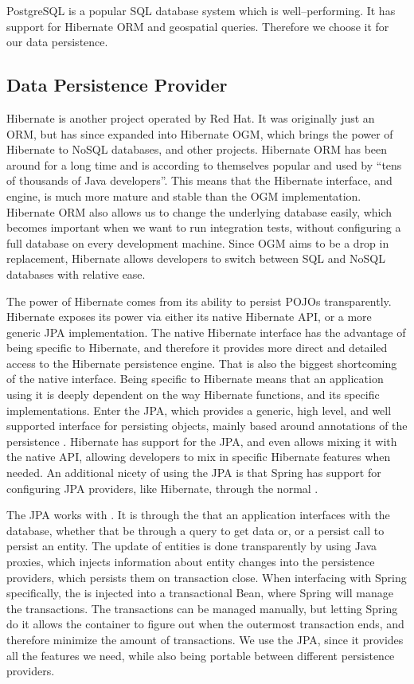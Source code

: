 PostgreSQL is a popular SQL database system which is well--performing.
It has support for Hibernate ORM and geospatial queries.
Therefore we choose it for our data persistence.

\subsection{Data Persistence Provider}
Hibernate is another project operated by Red Hat.
It was originally just an \ac{ORM}, but has since expanded into Hibernate \ac{OGM}, which brings the power of Hibernate to NoSQL databases, and other projects.
Hibernate \ac{ORM} has been around for a long time and is according to themselves popular and used by ``tens of thousands of Java developers''.\cite{hibernate_pop}
This means that the Hibernate interface, and engine, is much more mature and stable than the \ac{OGM} implementation.
Hibernate \ac{ORM} also allows us to change the underlying database easily, which becomes important when we want to run integration tests, without configuring a full database on every development machine.
Since \ac{OGM} aims to be a drop in replacement, Hibernate allows developers to switch between SQL and NoSQL databases with relative ease.

The power of Hibernate comes from its ability to persist \acp{POJO} transparently.
Hibernate exposes its power via either its native Hibernate API, or a more generic \ac{JPA} implementation.
The native Hibernate interface has the advantage of being specific to Hibernate, and therefore it provides more direct and detailed access to the Hibernate persistence engine.
That is also the biggest shortcoming of the native interface.
Being specific to Hibernate means that an application using it is deeply dependent on the way Hibernate functions, and its specific implementations.
Enter the \ac{JPA}, which provides a generic, high level, and well supported interface for persisting objects, mainly based around annotations of the persistence .
Hibernate has support for the \ac{JPA}, and even allows mixing it with the native API, allowing developers to mix in specific Hibernate features when needed.
An additional nicety of using the \ac{JPA} is that Spring has support for configuring \ac{JPA} providers, like Hibernate, through the normal .

The \ac{JPA} works with .
It is through the  that an application interfaces with the database, whether that be through a query to get data or, or a persist call to persist an entity.
The update of entities is done transparently by using Java proxies, which injects information about entity changes into the persistence providers, which persists them on transaction close.
When interfacing with Spring specifically, the  is injected into a transactional Bean, where Spring will manage the transactions.
The transactions can be managed manually, but letting Spring do it allows the container  to figure out when the outermost transaction ends, and therefore minimize the amount of transactions.
We use the \ac{JPA}, since it provides all the features we need, while also being portable between different persistence providers.

